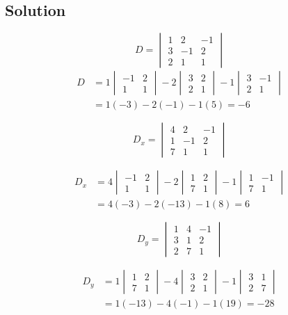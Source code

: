 \subsection*{Solution}

\[
	D = \begin{vmatrix}
		1 & 2 & -1 \\
		3 & -1 & 2 \\
		2 & 1 & 1
	\end{vmatrix}
\]
\begin{align*}
	D &= 1\begin{vmatrix}
		-1 & 2 \\
		1 & 1
	\end{vmatrix} - 2\begin{vmatrix}
		3 & 2 \\
		2 & 1
	\end{vmatrix} - 1\begin{vmatrix}
		3 & -1 \\
		2 & 1
	\end{vmatrix} \\
	&= 1(-3) - 2(-1) - 1(5) = -6
\end{align*}

\[
	D_x = \begin{vmatrix}
		4 & 2 & -1 \\
		1 & -1 & 2 \\
		7 & 1 & 1
	\end{vmatrix}
\]

\begin{align*}
	D_x &= 4\begin{vmatrix}
		-1 & 2 \\
		1 & 1
	\end{vmatrix} - 2\begin{vmatrix}
		1 & 2 \\
		7 & 1
	\end{vmatrix} - 1\begin{vmatrix}
		1 & -1 \\
		7 & 1
	\end{vmatrix} \\
	&= 4(-3) - 2(-13) - 1(8) = 6
\end{align*}

\[
	D_y = \begin{vmatrix}
		1 & 4 & -1 \\
		3 & 1 & 2 \\
		2 & 7 & 1
	\end{vmatrix}
\]

\begin{align*}
	D_y &= 1\begin{vmatrix}
		1 & 2 \\
		7 & 1
	\end{vmatrix} - 4\begin{vmatrix}
		3 & 2 \\
		2 & 1
	\end{vmatrix} - 1\begin{vmatrix}
		3 & 1 \\
		2 & 7
	\end{vmatrix} \\
	&= 1(-13) - 4(-1) - 1(19) = -28
\end{align*}

